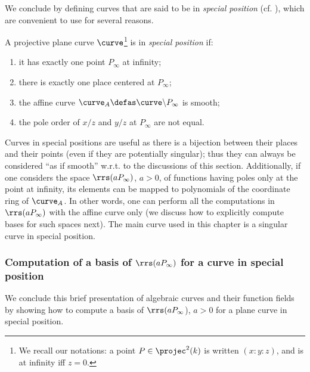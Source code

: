 We conclude by defining curves that are said to be in \emph{special position} (cf. \eg \cite{DBLP:journals/tit/SaintsH95}), which are convenient to use for several reasons.

\begin{defi}
A projective plane curve $\curve$\footnote{We recall our notations: a point $P \in \projec^2(k)$ is written $(x : y : z)$, and is
at infinity iff $z = 0$.} is in \emph{special position} if:
\begin{enumerate}
\item it has exactly one point $P_\infty$ at infinity;
\item there is exactly one place centered at $P_\infty$;
\item the affine curve $\curve_A \defas \curve\backslash P_\infty$ is smooth;
\item the pole order of $x/z$ and $y/z$ at $P_\infty$ are not equal.
\end{enumerate}
\end{defi}

Curves in special positions are useful as there is a bijection between their places and their points (even if they are potentially singular); thus they can always be considered
``as if smooth'' w.r.t. to the discussions of this section. Additionally, if one considers the space $\rrs(aP_\infty)$, $a > 0$, of functions having poles only at the point at infinity,
its elements can be mapped to polynomials of the coordinate ring of $\curve_A$. In other words, one can perform all the computations in $\rrs(aP_\infty)$ with the affine curve
only (we discuss how to explicitly compute bases for such spaces next). The main curve used in this chapter is a singular curve in special position.

\subsubsection{Computation of a basis of $\rrs(aP_\infty)$ for a curve in special position}

We conclude this brief presentation of algebraic curves and their function fields by showing how to compute a basis of $\rrs(aP_\infty$), $a > 0$
for a plane curve in special position.

